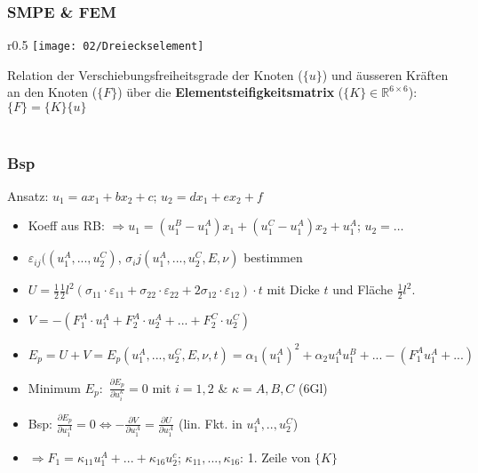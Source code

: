         \subsubsection{SMPE \& FEM}
            \begin{wrapfigure}[8]{r}{0.5\linewidth}
                \vspace{-2mm}
                \texttt{[image: 02/Dreieckselement]}
            \end{wrapfigure}
            Relation der Verschiebungsfreiheitsgrade der Knoten ($\{u\}$) und äusseren Kräften an den Knoten ($\{F\}$) über die \textbf{Elementsteifigkeitsmatrix} ($\{K\}\in\mathbb{R}^{6\times6}$): $\{F\}=\{K\}\{u\}$\\\\
\vfill\null\columnbreak            
        \subsubsection{Bsp}
            Ansatz: $u_1=ax_1+bx_2+c$; $u_2=dx_1+ex_2+f$
            \begin{itemize}
                \item Koeff aus RB: $\Rightarrow u_1=(u_1^B-u_1^A)x_1+(u_1^C-u_1^A)x_2+u_1^A$; $u_2=\dots$
                \item $\varepsilon_{ij}((u_1^A,...,u_2^C)$, $\sigma_ij(u_1^A,...,u_2^C,E,\nu)$ bestimmen
                \item $U=\frac{1}{2}\frac{1}{2}l^2(\sigma_{11}\cdot\varepsilon_{11}+\sigma_{22}\cdot\varepsilon_{22}+2\sigma_{12}\cdot\varepsilon_{12})\cdot t$ mit Dicke $t$ und Fläche $\frac{1}{2}l^2$.
                \item $V=-(F_1^A\cdot u_1^A+F_2^A\cdot u_2^A+...+F_2^C\cdot u_2^C)$
                \item $E_p=U+V=E_p(u_1^A,...,u_2^C,E,\nu,t)=\alpha_1(u_1^A)^2+\alpha_2u_1^Au_1^B+ ...-(F_1^Au_1^A+...)$
                \item Minimum $E_p:$ $\displaystyle\frac{\partial E_p}{\partial u_i^\kappa}=0$ mit $i=1,2$ \& $\kappa=A,B,C$ (6Gl)
                \item Bsp: $\displaystyle\frac{\partial E_p}{\partial u_1^A}=0 \Leftrightarrow -\frac{\partial V}{\partial u_1^A}=\frac{\partial U}{\partial u_1^A}$ (lin. Fkt. in $u_1^A,..,u_2^C$) 
                \item $\Rightarrow F_1=\kappa_{11}u_1^A+...+\kappa_{16}u_2^c$; $\kappa_{11},...,\kappa_{16}$: 1. Zeile von $\{K\}$
            \end{itemize}
            